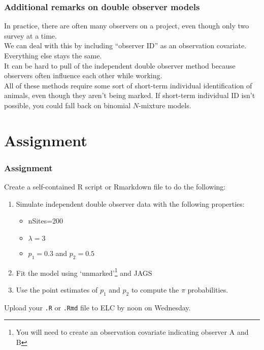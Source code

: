\documentclass[color=usenames,dvipsnames]{beamer}\usepackage[]{graphicx}\usepackage[]{xcolor}
\begin{document}
\begin{frame}
  \frametitle{Additional remarks on double observer models}
  In practice, there are often many observers on a project, even
  though only two survey at a time. \\
  \pause
  \vfill
  We can deal with this by including ``observer ID'' as an observation
  covariate. Everything else stays the same. \\
  \pause
  \vfill
  It can be hard to pull of the independent double observer method
  because observers often influence each other while working. \\
  \pause
  \vfill
  All of these methods require some sort of \alert{short-term}
  individual identification of animals, even though they aren't being
  marked.
  \pause
  \vfill
  If short-term individual ID isn't possible, you could fall
  back on binomial $N$-mixture models.
\end{frame}




\section{Assignment}




\begin{frame}[fragile]
  \frametitle{Assignment}
  \footnotesize
  Create a self-contained R script or Rmarkdown file
  to do the following:
  \vfill
  \begin{enumerate}
    \footnotesize
    \item Simulate \alert{independent} double observer data with the following
      properties:
      \begin{itemize}
        \item nSites=200
        \item $\lambda=3$
        \item $p_1=0.3$ and $p_2=0.5$
      \end{itemize}
    \item Fit the model using `unmarked'\footnote{\scriptsize You will
        need to create an observation covariate indicating observer A
        and B} and JAGS
    \item Use the point estimates of $p_1$ and $p_2$ to compute the $\pi$ probabilities. 
  \end{enumerate}
  \vfill
  Upload your {\tt .R} or {\tt .Rmd} file to ELC by noon on Wednesday.
\end{frame}
\end{document}
